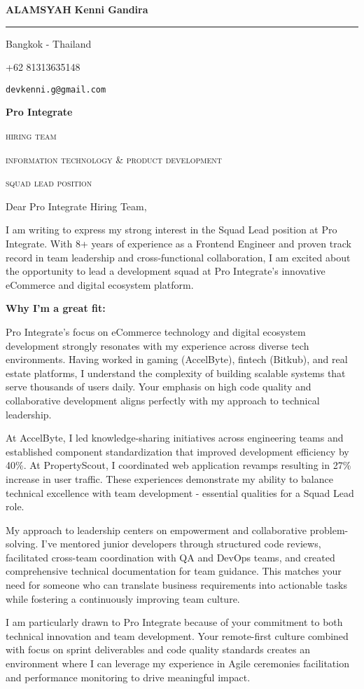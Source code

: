 \documentclass[12pt]{article}
\newcommand{\firstname}{Kenni Gandira}
\newcommand{\lastname}{Alamsyah}
\newcommand{\mainColor}{redBlood} %
\newlength{\spacebox}
\newcommand{\shspace}{\hspace*{0.8em}}
\newcommand{\xvspace}{\vspace*{0.1em}}
\newcommand{\svspace}{\vspace*{0.5em}}
\newcommand{\mvspace}{\vspace*{1.5em}}
\newcommand{\negmvspace}{\vspace*{-1em}}
\newcommand{\userInfo}[4]{
    \begin{flushleft}
        \color{\mainColor}
        \Huge
        \textbf{\MakeUppercase{\lastname}}
        \color{black}
        \textbf{\firstname}
        \color{\mainColor}
        \noindent\rule{19.1cm}{0.8pt}
        \color{grayShy}
        \small
        \par
        \parbox{7\spacebox} {
            \faMap \shspace #1 - #2 \par \svspace
            \faPhone \shspace #3 \par \svspace
            \faEnvelopeOpen \shspace \texttt{#4} \par \svspace
        }
        \color{\mainColor}
        \mvspace
    \end{flushleft}
    \negmvspace
}
\newcommand{\companyInfo}[4]{
    \begin{flushright}
        \parbox{4\spacebox}{
            \raggedleft
            \small
            \textbf{#1}\par
            \mvspace
            \color{grayShy} \textsc{\MakeLowercase{#2}}\par
            \xvspace
            \textsc{\MakeLowercase{#3}}\par
            \xvspace
            \textsc{\MakeLowercase{#4}}\par
            \color{black}
        }
    \end{flushright}
    \negmvspace
}
\begin{document}
\userInfo{Bangkok}{Thailand}{+62 81313635148}{devkenni.g@gmail.com}

\companyInfo{Pro Integrate}{Hiring Team}{Information Technology \& Product Development}{Squad Lead Position}

\mvspace

Dear Pro Integrate Hiring Team,

\svspace

I am writing to express my strong interest in the Squad Lead position at Pro Integrate. With 8+ years of experience as a Frontend Engineer and proven track record in team leadership and cross-functional collaboration, I am excited about the opportunity to lead a development squad at Pro Integrate's innovative eCommerce and digital ecosystem platform.

\svspace

\textbf{Why I'm a great fit:}

\svspace

Pro Integrate's focus on eCommerce technology and digital ecosystem development strongly resonates with my experience across diverse tech environments. Having worked in gaming (AccelByte), fintech (Bitkub), and real estate platforms, I understand the complexity of building scalable systems that serve thousands of users daily. Your emphasis on high code quality and collaborative development aligns perfectly with my approach to technical leadership.

\svspace

At AccelByte, I led knowledge-sharing initiatives across engineering teams and established component standardization that improved development efficiency by 40\%. At PropertyScout, I coordinated web application revamps resulting in 27\% increase in user traffic. These experiences demonstrate my ability to balance technical excellence with team development - essential qualities for a Squad Lead role.

\svspace

My approach to leadership centers on empowerment and collaborative problem-solving. I've mentored junior developers through structured code reviews, facilitated cross-team coordination with QA and DevOps teams, and created comprehensive technical documentation for team guidance. This matches your need for someone who can translate business requirements into actionable tasks while fostering a continuously improving team culture.

\svspace

I am particularly drawn to Pro Integrate because of your commitment to both technical innovation and team development. Your remote-first culture combined with focus on sprint deliverables and code quality standards creates an environment where I can leverage my experience in Agile ceremonies facilitation and performance monitoring to drive meaningful impact.
\end{document}
